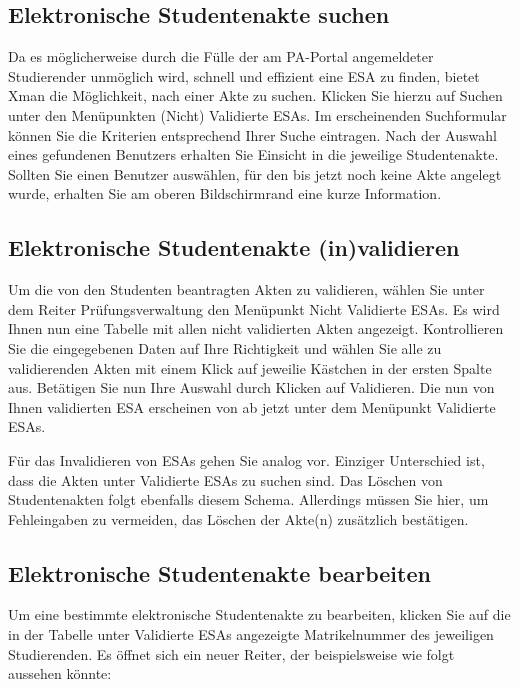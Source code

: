 \documentclass[a4paper,11pt]{article}
\newcommand{\knopf}[1]{{\sc #1}}
\begin{document}
\subsection{Elektronische Studentenakte suchen}

Da es möglicherweise durch die Fülle der am PA-Portal angemeldeter Studierender
unmöglich wird, schnell und effizient eine ESA zu finden, bietet Xman die
Möglichkeit, nach einer Akte zu suchen. Klicken Sie hierzu auf \knopf{Suchen}
unter den Menüpunkten \knopf{(Nicht) Validierte ESAs}. Im erscheinenden
Suchformular können Sie die Kriterien entsprechend Ihrer Suche eintragen. Nach
der Auswahl eines gefundenen Benutzers erhalten Sie Einsicht in die jeweilige
Studentenakte. Sollten Sie einen Benutzer auswählen, für den bis jetzt noch
keine Akte angelegt wurde, erhalten Sie am oberen Bildschirmrand eine kurze
Information.

\subsection{Elektronische Studentenakte (in)validieren}

Um die von den Studenten beantragten Akten zu validieren, wählen Sie unter dem
Reiter \knopf{Prüfungsverwaltung} den Menüpunkt \knopf{Nicht Validierte ESAs}.
Es wird Ihnen nun eine Tabelle mit allen nicht validierten Akten angezeigt.
Kontrollieren Sie die eingegebenen Daten auf Ihre Richtigkeit und wählen Sie
alle zu validierenden Akten mit einem Klick auf jeweilie Kästchen in der
ersten Spalte aus. Betätigen Sie nun Ihre Auswahl durch Klicken auf
\knopf{Validieren}. Die nun von Ihnen validierten ESA erscheinen von ab jetzt
unter dem Menüpunkt \knopf{Validierte ESAs}.

Für das Invalidieren von ESAs gehen Sie analog vor. Einziger Unterschied ist,
dass die Akten unter \knopf{Validierte ESAs} zu suchen sind.  Das Löschen von
Studentenakten folgt ebenfalls diesem Schema. Allerdings müssen Sie hier, um
Fehleingaben zu vermeiden, das Löschen der Akte(n) zusätzlich bestätigen.

\subsection{Elektronische Studentenakte bearbeiten}

Um eine bestimmte elektronische Studentenakte zu bearbeiten, klicken Sie auf
die in der Tabelle unter \knopf{Validierte ESAs} angezeigte Matrikelnummer des
jeweiligen Studierenden. Es öffnet sich ein neuer Reiter, der beispielsweise wie
folgt aussehen könnte:
\end{document}
